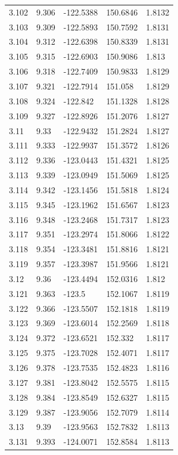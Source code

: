 \begin{tabular}{lllll}
3.102 & 9.306 & -122.5388 & 150.6846 & 1.8132 \\
3.103 & 9.309 & -122.5893 & 150.7592 & 1.8131 \\
3.104 & 9.312 & -122.6398 & 150.8339 & 1.8131 \\
3.105 & 9.315 & -122.6903 & 150.9086 & 1.813 \\
3.106 & 9.318 & -122.7409 & 150.9833 & 1.8129 \\
3.107 & 9.321 & -122.7914 & 151.058 & 1.8129 \\
3.108 & 9.324 & -122.842 & 151.1328 & 1.8128 \\
3.109 & 9.327 & -122.8926 & 151.2076 & 1.8127 \\
3.11 & 9.33 & -122.9432 & 151.2824 & 1.8127 \\
3.111 & 9.333 & -122.9937 & 151.3572 & 1.8126 \\
3.112 & 9.336 & -123.0443 & 151.4321 & 1.8125 \\
3.113 & 9.339 & -123.0949 & 151.5069 & 1.8125 \\
3.114 & 9.342 & -123.1456 & 151.5818 & 1.8124 \\
3.115 & 9.345 & -123.1962 & 151.6567 & 1.8123 \\
3.116 & 9.348 & -123.2468 & 151.7317 & 1.8123 \\
3.117 & 9.351 & -123.2974 & 151.8066 & 1.8122 \\
3.118 & 9.354 & -123.3481 & 151.8816 & 1.8121 \\
3.119 & 9.357 & -123.3987 & 151.9566 & 1.8121 \\
3.12 & 9.36 & -123.4494 & 152.0316 & 1.812 \\
3.121 & 9.363 & -123.5 & 152.1067 & 1.8119 \\
3.122 & 9.366 & -123.5507 & 152.1818 & 1.8119 \\
3.123 & 9.369 & -123.6014 & 152.2569 & 1.8118 \\
3.124 & 9.372 & -123.6521 & 152.332 & 1.8117 \\
3.125 & 9.375 & -123.7028 & 152.4071 & 1.8117 \\
3.126 & 9.378 & -123.7535 & 152.4823 & 1.8116 \\
3.127 & 9.381 & -123.8042 & 152.5575 & 1.8115 \\
3.128 & 9.384 & -123.8549 & 152.6327 & 1.8115 \\
3.129 & 9.387 & -123.9056 & 152.7079 & 1.8114 \\
3.13 & 9.39 & -123.9563 & 152.7832 & 1.8113 \\
3.131 & 9.393 & -124.0071 & 152.8584 & 1.8113 \\

\end{tabular}
